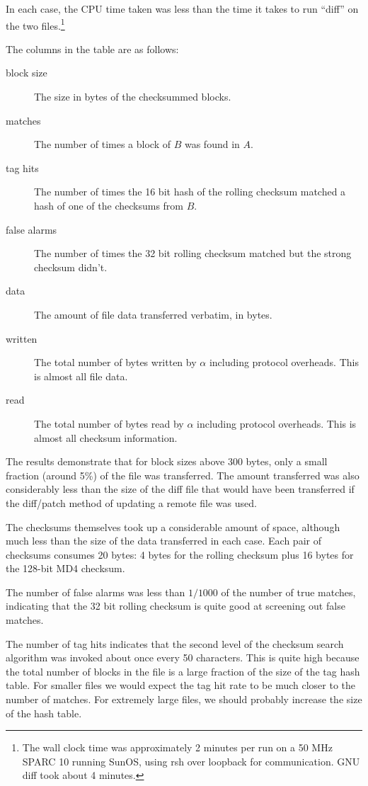 \documentclass[a4paper]{article}
\begin{document}
In each case, the CPU time taken was less than the
time it takes to run ``diff'' on the two files.\footnote{The wall
  clock time was approximately 2 minutes per run on a 50 MHz SPARC 10
  running SunOS, using rsh over loopback for communication.  GNU diff
  took about 4 minutes.}

The columns in the table are as follows:

\begin{description}
\item [block size] The size in bytes of the checksummed blocks.
\item [matches] The number of times a block of $B$ was found in $A$.
\item [tag hits] The number of times the 16 bit hash of the rolling
  checksum matched a hash of one of the checksums from $B$.
\item [false alarms] The number of times the 32 bit rolling checksum
  matched but the strong checksum didn't.
\item [data] The amount of file data transferred verbatim, in bytes.
\item [written] The total number of bytes written by $\alpha$
  including protocol overheads. This is almost all file data.
\item [read] The total number of bytes read by $\alpha$ including
  protocol overheads. This is almost all checksum information.
\end{description}

The results demonstrate that for block sizes above 300 bytes, only a
small fraction (around 5\%) of the file was transferred. The amount
transferred was also considerably less than the size of the diff file
that would have been transferred if the diff/patch method of updating
a remote file was used.

The checksums themselves took up a considerable amount of space,
although much less than the size of the data transferred in each
case. Each pair of checksums consumes 20 bytes: 4 bytes for the
rolling checksum plus 16 bytes for the 128-bit MD4 checksum.

The number of false alarms was less than $1/1000$ of the number of
true matches, indicating that the 32 bit rolling checksum is quite
good at screening out false matches. 

The number of tag hits indicates that the second level of the
checksum search algorithm was invoked about once every 50
characters.  This is quite high because the total number of blocks in
the file is a large fraction of the size of the tag hash table. For
smaller files we would expect the tag hit rate to be much closer to
the number of matches.  For extremely large files, we should probably
increase the size of the hash table.
\end{document}
